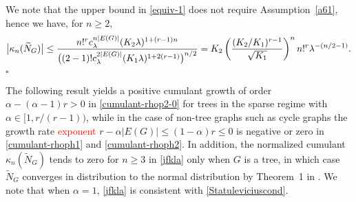 \documentclass[12pt]{article}
\newenvironment{Proof}{\removelastskip\par\medskip
\noindent{\em Proof.} \rm}{\penalty-20\null\hfill$\square$\par\medbreak}
\numberwithin{equation}{section}
\begin{document}
\begin{Proof}
  We note that the upper bound in \eqref{equiv-1}
  does not require Assumption~\ref{a61},
  hence we have, for $n\geq 2$,
$$ 
   \big|\kappa_n(\widetilde{N}_G)\big|
  \leq 
   \frac{n!^r %
     c_\lambda^{n|E(G)|} (K_2 \lambda )^{1+(r-1)n}}{\big((2-1)! c_\lambda^{2|E(G)|}
   (K_1 \lambda )^{1+2(r-1)}\big)^{n/2}}
 = 
   K_2
   \left(
   \frac{ %
      (K_2/K_1)^{r-1}}{\sqrt{K_1}}
   \right)^n
   n!^r \lambda^{-(n/2-1)}. 
$$ 
\end{Proof}
The following result yields a positive cumulant growth
of order $\alpha     -(\alpha - 1)r>0$
in \eqref{cumulant-rhop2-0} for trees in the sparse regime
with $\alpha \in [1, r/(r-1) )$,
while in the case of non-tree graphs such as
cycle graphs the growth rate \textcolor{red}{exponent}
$r - \alpha |E(G)|
\leq ( 1 - \alpha ) r \leq 0$
is negative or zero in \eqref{cumulant-rhoph1} and \eqref{cumulant-rhoph2}. 
In addition, the normalized cumulant 
$\kappa_n(\widetilde{N}_G)$ tends to zero for $n\geq 3$ in \eqref{jfkla} only
when $G$ is a tree, in which case 
$\widetilde{N}_G$ converges in distribution to the normal
distribution by Theorem~1 in \cite{Janson1988}.   
We note that when $\alpha = 1$, \eqref{jfkla} is consistent with
 \eqref{Statuleviciuscond}. 
\end{document}
